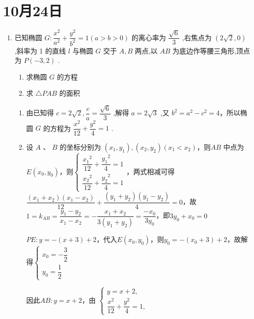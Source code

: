 \section*{10月24日}
\begin{enumerate}
    \item 已知椭圆 $G : \dfrac{{x}^{2}}{{a}^{2}} + \dfrac{{y}^{2}}{{b}^{2}} = 1\left( {a > b > 0}\right)$ 的离心率为 $\dfrac{\sqrt{6}}{3}$ ,右焦点为 $\left( {2\sqrt{2},0}\right)$ ,斜率为 1 的直线 $l$ 与椭圆 $G$ 交于 $A,B$ 两点,以 ${AB}$ 为底边作等腰三角形,顶点为 $P\left( {-3,2}\right)$ .
    \begin{enumerate}
        \item 求椭圆 $G$ 的方程
        \item 求 $\bigtriangleup {PAB}$ 的面积
    \end{enumerate}
    \begin{jieda}
        \begin{enumerate}
            \item 由已知得 $c = 2\sqrt{2},\dfrac{c}{a} = \dfrac{\sqrt{6}}{3}$ ,解得 $a = 2\sqrt{3}$ ,又 ${b}^{2} = {a}^{2} - {c}^{2} = 4$，所以椭圆 $G$ 的方程为 $\dfrac{{x}^{2}}{12} + \dfrac{{y}^{2}}{4} = 1$ .
            
            \item 设 $A$ 、 $B$ 的坐标分别为 $\left( {{x}_{1},{y}_{1}}\right) ,\left( {{x}_{2},{y}_{2}}\right) \left( {{x}_{1} < {x}_{2}}\right)$，则${AB}$ 中点为 $E\left( {{x}_{0},{y}_{0}}\right)$，则$\left\{\begin{array}{l}
                 \dfrac{{x_1}^{2}}{12} + \dfrac{{y_1}^{2}}{4} = 1 \\
                 \dfrac{{x_2}^{2}}{12} + \dfrac{{y_2}^{2}}{4} = 1
            \end{array}\right.$，两式相减可得$\dfrac{(x_1+x_2)(x_1-x_2)}{12} + \dfrac{(y_1+y_2)(y_1-y_2)}{4} = 0$，故$1 = k_{AB} = \dfrac{y_1-y_2}{x_1-x_2} = -\dfrac{x_1+x_2}{3(y_1+y_2)} = \dfrac{-x_0}{3y_0}$，即$3y_0+x_0 = 0$
            
            $PE: y = -(x+3)+2$，代入$E\left( {{x}_{0},{y}_{0}}\right)$，则$y_0 = -(x_0+3)+2$，故解得$\left\{\begin{array}{l}
                 x_0 = -\dfrac{3}{2}  \\
                 y_0 = \dfrac{1}{2}
            \end{array}\right.$

            因此$AB: y = x+2$，由 $\left\{  \begin{array}{l} y = x + 2, \\  
                                            \dfrac{{x}^{2}}{12} + \dfrac{{y}^{2}}{4} = 1, 
                                            \end{array} \right.$
            

\end{enumerate}
\end{jieda}
\end{enumerate}
